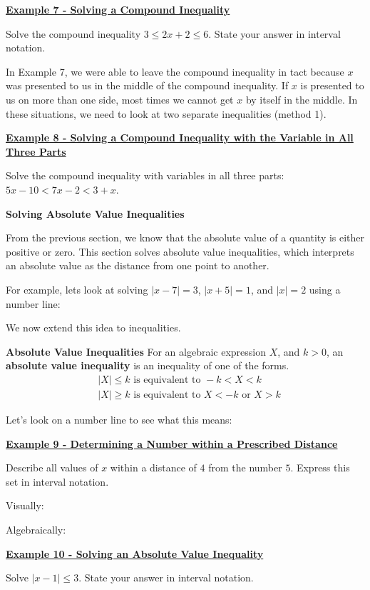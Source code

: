 \documentclass[12pt]{book}
\begin{document}
\underline{\textbf{Example 7 - Solving a Compound Inequality}}

Solve the compound inequality $3 \leq 2x+2 \leq 6$. State your answer in interval notation.


\newpage
In Example 7, we were able to leave the compound inequality in tact because $x$ was presented to us in the middle of the compound inequality. If $x$ is presented to us on more than one side, most times we cannot get $x$ by itself in the middle. In these situations, we need to look at two separate inequalities (method 1). 

\vspace{3mm}
\underline{\textbf{Example 8 - Solving a Compound Inequality with the Variable in All Three Parts}}

Solve the compound inequality with variables in all three parts: $ 5x-10 < 7x-2  < 3 + x$.
\vspace{50mm}

{\large \textbf{Solving Absolute Value Inequalities}}
\vspace{3mm} 

From the previous section, we know that the absolute value of a quantity is either positive or zero.  This section solves absolute value inequalities, which interprets an absolute value as the distance from one point to another. 

For example, lets look at solving $|x-7|=3$, $|x+5|=1$, and $|x|=2$ using a number line: 



\vspace{95mm}
We now extend this idea to inequalities.
\newpage

\begin{boxR}
    \textbf{Absolute Value Inequalities}
    \vspace{1mm}
    \hline
    \vspace{2mm}
    For an algebraic expression $X$, and $k>0$, an \textbf{absolute value inequality} is an inequality of one of the forms.
    \begin{align*}
        &|X| \leq k \text{ is equivalent to } -k < X < k \\
        &|X| \geq k \text{ is equivalent to } X < -k \text{ or } X > k 
    \end{align*} 
\end{boxR}
\vspace{3mm}
Let's look on a number line to see what this means: 
\vspace{60mm}

\underline{\textbf{Example 9 - Determining a Number within a Prescribed Distance}}

Describe all values of $x$ within a distance of $4$ from the number $5$. Express this set in interval notation.
\vspace{10mm}

Visually: 
\vspace{40mm}

Algebraically:
\newpage

\underline{\textbf{Example 10 - Solving an Absolute Value Inequality}}

Solve $|x-1| \leq 3$. State your answer in interval notation.
\end{document}
